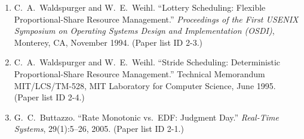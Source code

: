 \begin{enumerate}
  \item[{[1]}] C.~A.~Waldspurger and W.~E.~Weihl. ``Lottery Scheduling: Flexible
    Proportional-Share Resource Management.'' \emph{Proceedings of the First USENIX Symposium on
    Operating Systems Design and Implementation (OSDI)}, Monterey, CA, November 1994.
    (Paper list ID 2-3.)
  \item[{[2]}] C.~A.~Waldspurger and W.~E.~Weihl. ``Stride Scheduling: Deterministic
    Proportional-Share Resource Management.'' Technical Memorandum MIT/LCS/TM-528, MIT Laboratory
    for Computer Science, June 1995. (Paper list ID 2-4.)
  \item[{[3]}] G.~C.~Buttazzo. ``Rate Monotonic vs.\ EDF: Judgment Day.'' \emph{Real-Time
    Systems}, 29(1):5--26, 2005. (Paper list ID 2-1.)
\end{enumerate}
